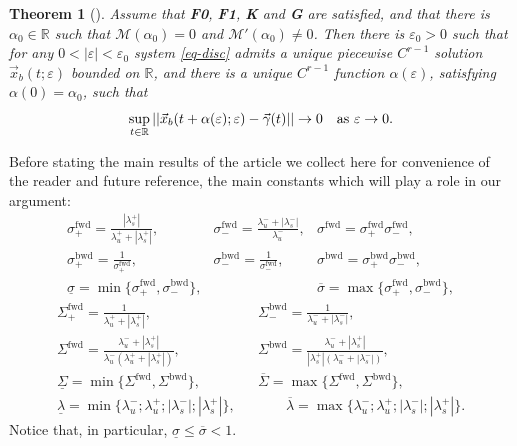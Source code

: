 \documentclass[10pt]{article}
\newtheorem{knowntheorem}{Theorem}
\numberwithin{equation}{section}
\def\sbwd{\sigma^{\textrm{bwd}}}
\def\sfwd{\sigma^{\textrm{fwd}}}
\def\sbwd{\sigma^{\textrm{bwd}}}
\def\sTfwd{\Sigma^{\textrm{fwd}}}
\def\sTbwd{\Sigma^{\textrm{bwd}}}
\def\al{\alpha}
\def\ga{\vec{\gamma}}
\def\ep{\varepsilon}
\def\la{\lambda}
\def\R{{\mathbb R}}
\def\MM{{\mathcal M}}
\def\x{\vec{x}}
\def\und{\underline}
\def\ov{\overline}
\newcommand\assump[1]{{\rm\textbf{#1}}}
\theoremstyle{definition}
\theoremstyle{remark}
\begin{document}
 \begin{knowntheorem}[\hspace{1sp}\cite{CaFr}]\label{TFSF2_2}%
	Assume that \assump{F0}, \assump{F1}, \assump{K} and \assump{G} are satisfied, and that there is $\al_0\in\R$ such that $\MM(\al_0)=0$ and
$\MM'(\al_0)\neq 0$.
Then  there is $\ep_{0}>0$ such that for any $0<|\ep|<\ep_0$
system \eqref{eq-disc} admits a  unique piecewise  $C^{r-1}$
solution $\x_b(t;\ep)$ bounded on $\R$, and there is a unique $C^{r-1}$ function
$\al(\ep)$, satisfying $\al(0) = \al_{0}$, such that
     \begin{equation*}
     \sup_{t\in\R}||\x_b(t+\al(\ep); \ep) - \ga(t)|| \to 0  \quad
     \hbox{as $\ep\to 0$}.
     \end{equation*}\end{knowntheorem}


Before stating the main results of the article we collect here for convenience of the reader and future reference,  the main constants which
will play a role in our argument:
\begin{equation}\label{defsigma}
\displaystyle
\begin{array}{ccc}
\sfwd_+= \frac{|\la_s^+|}{\la_u^++|\la_s^+|}, & \sfwd_-= \frac{\la_u^-+|\la_s^-|}{\la_u^-}, &
\sfwd=  \sfwd_+ \sfwd_-,  \\
  \sbwd_+=   \frac{1}{\sfwd_+}, & \sbwd_- =\frac{1}{\sfwd_-}, &  \sbwd=   \sbwd_+ \sbwd_-, \\
 \underline{\sigma} = \min \{ \sfwd_+ , \sbwd_-  \} , &  & \overline{\sigma}= \max \{ \sfwd_+ , \sbwd_-  \},
  \end{array}
\end{equation}
 \begin{equation*}
\displaystyle
\begin{array}{ccc}
  \sTfwd_+= \frac{1}{\la_u^++|\la_s^+|}, & & \sTbwd_- = \frac{1}{\la_u^- +|\la_s^-|},
  \\
\sTfwd=\frac{\la_u^-+|\la_s^+|}{\la_u^-(\la_u^++|\la_s^+|)} ,&  & \sTbwd= \frac{\la_u^{-}+|\la_s^+|}{|\la_s^+|(\la_u^-+|\la_s^-|)},\\
\underline{\Sigma}= \min \{ \sTfwd , \sTbwd  \} , &  & \overline{\Sigma}= \max \{ \sTfwd , \sTbwd  \},\\
\und{\la}= \min \{ \la_u^-; \la_u^+ ;|\la_s^-|;|\la_s^+| \} , & & \qquad \ov{\la}= \max \{ \la_u^-; \la_u^+ ;|\la_s^-|;|\la_s^+| \}.
\end{array}
\end{equation*}
 Notice that, in
particular,
$\underline{\sigma}\leq\overline{\sigma}<1$.
\end{document}
